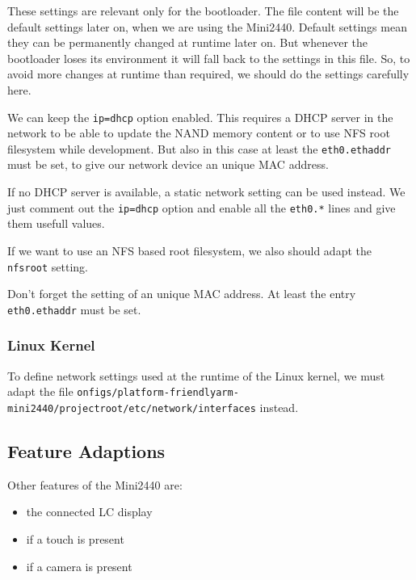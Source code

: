 These settings are relevant only for the bootloader. The file content will be
the default settings later on, when we are using the Mini2440. Default
settings mean they can be permanently changed at runtime later on. But whenever
the bootloader loses its environment it will fall back to the settings in this
file. So, to avoid more changes at runtime than required, we should do the
settings carefully here.

We can keep the \texttt{ip=dhcp} option enabled. This requires a DHCP server in
the network to be able to update the NAND memory content or to use NFS root
filesystem while development. But also in this case at least the
\texttt{eth0.ethaddr} must be set, to give our network device an unique MAC
address.

If no DHCP server is available, a static network setting can be used instead.
We just comment out the \texttt{ip=dhcp} option and enable all the
\texttt{eth0.*} lines and give them usefull values.

If we want to use an NFS based root filesystem, we also should adapt the
\texttt{nfsroot} setting.

\begin{important}
Don't forget the setting of an unique MAC address. At least the entry
\texttt{eth0.ethaddr} must be set.
\end{important}

\subsubsection{Linux Kernel}			\label{sec:linuxnetwork}

To define network settings used at the runtime of the Linux kernel, we must
adapt the file
\texttt{onfigs/platform-friendlyarm-mini2440/projectroot/etc/network/interfaces}
instead.

\subsection{Feature Adaptions}		\label{sec:featureadaptions}

Other features of the Mini2440 are:

\begin{itemize}
 \item the connected LC display
 \item if a touch is present
 \item if a camera is present
\end{itemize}

